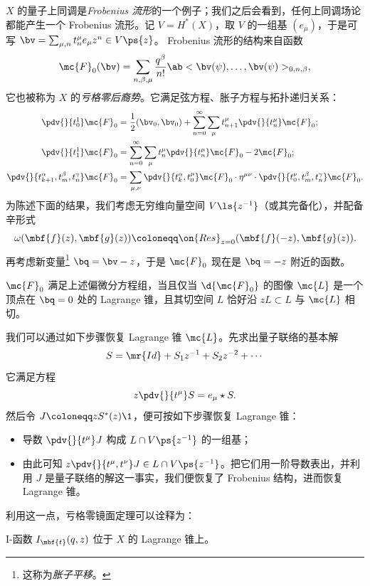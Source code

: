 \(X\) 的量子上同调是\textit{Frobenius 流形}的一个例子；我们之后会看到，任何上同调场论都能产生一个 Frobenius 流形。记 \(V = H^*(X)\)，取 \(V\) 的一组基 \((e_{\mu})\)，于是可写 $\bv = \sum_{\mu,n} t^{\mu}_n e_{\mu} z^n \in V\ps{z}$。
Frobenius 流形的结构来自函数
\[
    \mc{F}_0(\bv) = \sum_{n, \beta, \mu} \frac{q^{\beta}}{n!} \ab<\bv(\psi), \ldots, \bv(\psi)>_{0,n,\beta},
\]
它也被称为 \(X\) 的\textit{亏格零后裔势}。它满足弦方程、胀子方程与拓扑递归关系：
\begin{align*}
    \pdv{}{t_0^1} \mc{F}_0 &= \frac{1}{2} (\bv_0, \bv_0) + \sum_{n=0}^{\infty} \sum_{\mu} t_{n+1}^{\mu} \pdv{}{t_n^{\mu}} \mc{F}_0; \\
    \pdv{}{t_1^1} \mc{F}_0 &= \sum_{n=0}^{\infty} \sum_{\mu} t_n^{\mu} \pdv{}{t_n^{\mu}}\mc{F}_0 - 2 \mc{F}_0; \\
    \pdv{}{t_{k+1}^{\alpha},t_m^{\beta},t_n^{\gamma}} \mc{F}_0 &= \sum_{\mu,\nu} \pdv{}{t_k^{\alpha},t_0^{\mu}} \mc{F}_0 \cdot \eta^{\mu\nu} \cdot \pdv{}{t_0^{\nu},t_{m}^{\beta},t_n^{\gamma}} \mc{F}_0.
\end{align*}
为陈述下面的结果，我们考虑无穷维向量空间 $V\ls{z^{-1}}$（或其完备化），并配备辛形式
\[ \omega(\mbf{f}(z), \mbf{g}(z)) \coloneqq \on{Res}_{z=0}(\mbf{f}(-z), \mbf{g}(z)). \]
再考虑新变量\footnote{这称为\textit{胀子平移}。} $\bq = \bv - z$，于是 $\mc{F}_0$ 现在是 $\bq = -z$ 附近的函数。

\begin{thm}
    $\mc{F}_0$ 满足上述偏微分方程组，当且仅当 $\d{\mc{F}_0}$ 的图像 $\mc{L}$ 是一个顶点在 $\bq = 0$ 处的 Lagrange 锥，且其切空间 $L$ 恰好沿 $zL \subset L$ 与 $\mc{L}$ 相切。
\end{thm}

我们可以通过如下步骤恢复 Lagrange 锥 $\mc{L}$。先求出量子联络的基本解
\[ S = \mr{Id} + S_1 z^{-1} + S_2 z^{-2} + \cdots \]
它满足方程
\[ z \pdv{}{t^{\mu}}S = e_{\mu} \star S. \]
然后令 $J \coloneqq z S^*(z) \1$，便可按如下步骤恢复 Lagrange 锥：
\begin{itemize}
    \item 导数 $\pdv{}{t^{\mu}} J$ 构成 $L \cap V\ps{z^{-1}}$ 的一组基；
    \item 由此可知 $z \pdv{}{t^{\mu},t^{\nu}} J \in L \cap V \ps{z^{-1}}$。把它们用一阶导数表出，并利用 $J$ 是量子联络的解这一事实，我们便恢复了 Frobenius 结构，进而恢复 Lagrange 锥。
\end{itemize}

利用这一点，亏格零镜面定理可以诠释为：
\begin{thm}
    I-函数 \(I_{\mbf{t}}(q,z)\) 位于 \(X\) 的 Lagrange 锥上。
\end{thm}




